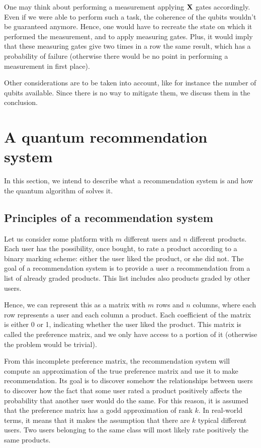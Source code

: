 \documentclass[11pt, a4paper]{article}
\begin{document}
            One may think about performing a measurement applying \(\mathbf{X}\) gates accordingly. Even if we were able to perform such a task, the coherence of the qubits wouldn't be guaranteed anymore. Hence, one would have to recreate the state on which it performed the measurement, and to apply measuring gates. Plus, it would imply that these measuring gates give two times in a row the same result, which has a probability of failure (otherwise there would be no point in performing a measurement in first place).
            
            Other considerations are to be taken into account, like for instance the number of qubits available. Since there is no way to mitigate them, we discuss them in the conclusion.
    \section{A quantum recommendation system}
        \label{sec:QRS}
        In this section, we intend to describe what a recommendation system is and how the quantum algorithm of \citeauthor{QRS} solves it.
        \subsection{Principles of a recommendation system}
            Let us consider some platform with \(m\) different users and \(n\) different products. Each user has the possibility, once bought, to rate a product according to a binary marking scheme: either the user liked the product, or she did not. The goal of a recommendation system is to provide a user a recommendation from a list of already graded products. This list includes also products graded by other users.
            
            Hence, we can represent this as a matrix with \(m\) rows and \(n\) columns, where each row represents a user and each column a product. Each coefficient of the matrix is either 0 or 1, indicating whether the user liked the product. This matrix is called the preference matrix, and we only have access to a portion of it (otherwise the problem would be trivial).
            
            From this incomplete preference matrix, the recommendation system will compute an approximation of the true preference matrix and use it to make recommendation. Its goal is to discover somehow the relationships between users to discover how the fact that some user rated a product positively affects the probability that another user would do the same. For this reason, it is assumed that the preference matrix has a godd approximation of rank \(k\). In real-world terms, it means that it makes the assumption that there are \(k\) typical different users. Two users belonging to the same class will most likely rate positively the same products.
            
\end{document}
